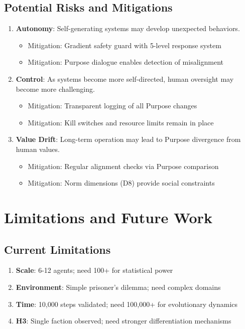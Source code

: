 \documentclass{article}
\begin{document}
\subsection{Potential Risks and Mitigations}
\begin{enumerate}
    \item \textbf{Autonomy}: Self-generating systems may develop unexpected behaviors.
    \begin{itemize}
        \item Mitigation: Gradient safety guard with 5-level response system
        \item Mitigation: Purpose dialogue enables detection of misalignment
    \end{itemize}
    \item \textbf{Control}: As systems become more self-directed, human oversight may become more challenging.
    \begin{itemize}
        \item Mitigation: Transparent logging of all Purpose changes
        \item Mitigation: Kill switches and resource limits remain in place
    \end{itemize}
    \item \textbf{Value Drift}: Long-term operation may lead to Purpose divergence from human values.
    \begin{itemize}
        \item Mitigation: Regular alignment checks via Purpose comparison
        \item Mitigation: Norm dimensions (D8) provide social constraints
    \end{itemize}
\end{enumerate}

\section{Limitations and Future Work}

\subsection{Current Limitations}
\begin{enumerate}
    \item \textbf{Scale}: 6-12 agents; need 100+ for statistical power
    \item \textbf{Environment}: Simple prisoner's dilemma; need complex domains
    \item \textbf{Time}: 10,000 steps validated; need 100,000+ for evolutionary dynamics
    \item \textbf{H3}: Single faction observed; need stronger differentiation mechanisms
\end{enumerate}
\end{document}
